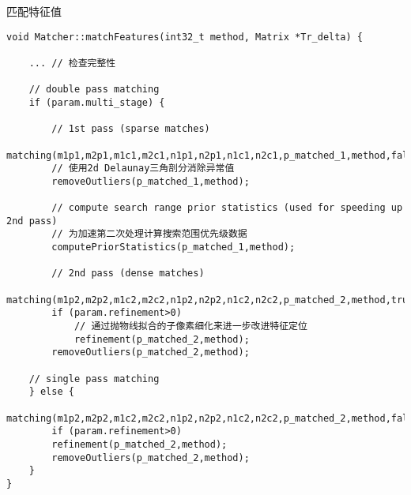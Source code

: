 \documentclass[UTF8]{ctexart}
\begin{document}
    匹配特征值
    \begin{verbatim}
void Matcher::matchFeatures(int32_t method, Matrix *Tr_delta) {

    ... // 检查完整性

    // double pass matching
    if (param.multi_stage) {

        // 1st pass (sparse matches)
        matching(m1p1,m2p1,m1c1,m2c1,n1p1,n2p1,n1c1,n2c1,p_matched_1,method,false,Tr_delta);
        // 使用2d Delaunay三角剖分消除异常值
        removeOutliers(p_matched_1,method);
        
        // compute search range prior statistics (used for speeding up 2nd pass)
        // 为加速第二次处理计算搜索范围优先级数据
        computePriorStatistics(p_matched_1,method);      

        // 2nd pass (dense matches)
        matching(m1p2,m2p2,m1c2,m2c2,n1p2,n2p2,n1c2,n2c2,p_matched_2,method,true,Tr_delta);
        if (param.refinement>0)
            // 通过抛物线拟合的子像素细化来进一步改进特征定位
            refinement(p_matched_2,method);
        removeOutliers(p_matched_2,method);

    // single pass matching
    } else {
        matching(m1p2,m2p2,m1c2,m2c2,n1p2,n2p2,n1c2,n2c2,p_matched_2,method,false,Tr_delta);
        if (param.refinement>0)
        refinement(p_matched_2,method);
        removeOutliers(p_matched_2,method);
    }
}
    \end{verbatim}
\end{document}

